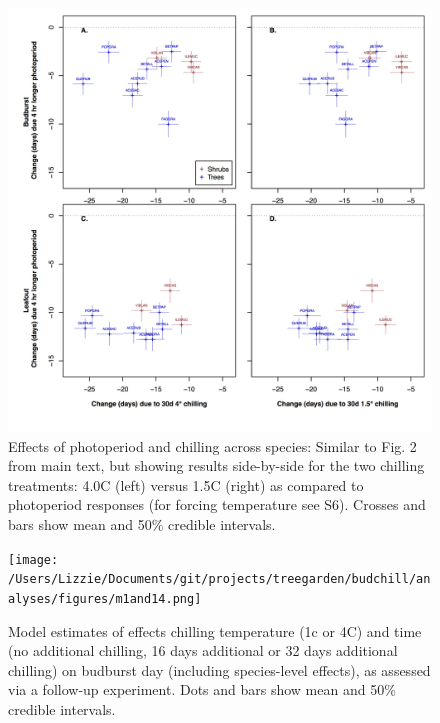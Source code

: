 \documentclass{article}
\begin{document}
\begin{figure}
\label{fig:figS7}
\includegraphics[width=1\textwidth]{FigChillPhoto_4panel.png}
\caption{Effects of photoperiod and chilling across species: Similar to Fig. 2 from main text, but showing results side-by-side for the two chilling treatments: 4.0\degree C (left) versus 1.5\degree C (right) as compared to photoperiod responses (for forcing temperature see S6). Crosses and bars show mean and 50\% credible intervals.}
\end{figure}

\begin{figure}
\texttt{[image: /Users/Lizzie/Documents/git/projects/treegarden/budchill/analyses/figures/m1and14.png]} %
\caption{Model estimates of effects chilling temperature (1\degree c or 4\degree C) and time (no additional chilling, 16 days additional or 32 days additional chilling) on budburst day (including species-level effects), as assessed via a follow-up experiment. Dots and bars show mean and 50\% credible intervals.}
\label{fig:figbudchill}
\end{figure}
\end{document}
